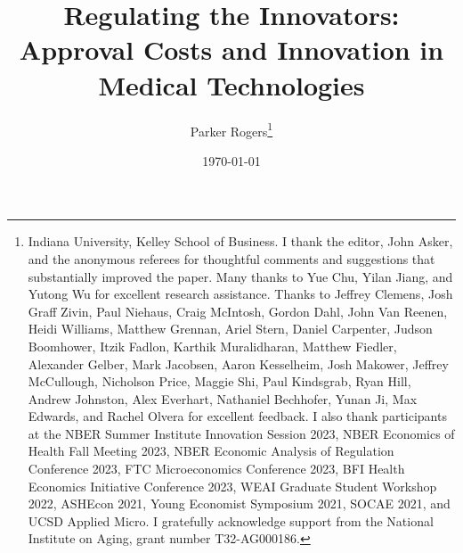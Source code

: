 \documentclass[letterpaper,12pt]{article}
\theoremstyle{definition}
\begin{document}

\begin{titlepage}
\title{Regulating the Innovators: \\ Approval Costs and Innovation in Medical Technologies}


\author{Parker Rogers\thanks{Indiana University, Kelley School of Business. I thank the editor, John Asker, and the anonymous referees for thoughtful comments and suggestions that substantially improved the paper. Many thanks to Yue Chu, Yilan Jiang, and Yutong Wu for excellent research assistance. Thanks to Jeffrey Clemens, Josh Graff Zivin, Paul Niehaus, Craig McIntosh, Gordon Dahl, John Van Reenen, Heidi Williams, Matthew Grennan, Ariel Stern, Daniel Carpenter, Judson Boomhower, Itzik Fadlon, Karthik Muralidharan, Matthew Fiedler, Alexander Gelber, Mark Jacobsen, Aaron Kesselheim, Josh Makower, Jeffrey McCullough, Nicholson Price, Maggie Shi, Paul Kindsgrab, Ryan Hill, Andrew Johnston, Alex Everhart, Nathaniel Bechhofer, Yunan Ji, Max Edwards, and Rachel Olvera for excellent feedback. I also thank participants at the NBER Summer Institute Innovation Session 2023, NBER Economics of Health Fall Meeting 2023, NBER Economic Analysis of Regulation Conference 2023, FTC Microeconomics Conference 2023, BFI Health Economics Initiative Conference 2023, WEAI Graduate Student Workshop 2022, ASHEcon 2021, Young Economist Symposium 2021, SOCAE 2021, and UCSD Applied Micro. I gratefully acknowledge support from the National Institute on Aging, grant number T32-AG000186.
}}
\date{\today}





\maketitle




\end{titlepage}
\end{document}
